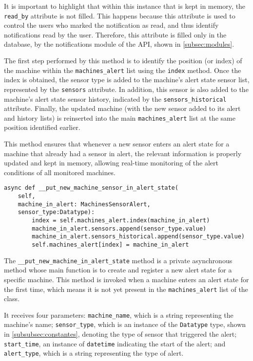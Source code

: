 It is important to highlight that within this instance that is kept in memory, the \texttt{read\_by} attribute is not filled. This happens because this attribute is used to control the users who marked the notification as read, and thus identify notifications read by the user. Therefore, this attribute is filled only in the database, by the notifications module of the \gls{API}, shown in \ref{subsec:modules}.

The first step performed by this method is to identify the position (or index) of the machine within the \texttt{machines\_alert} list using the \texttt{index} method. Once the index is obtained, the sensor type is added to the machine's alert state sensor list, represented by the \texttt{sensors} attribute. In addition, this sensor is also added to the machine's alert state sensor history, indicated by the \texttt{sensors\_historical} attribute. Finally, the updated machine (with the new sensor added to its alert and history lists) is reinserted into the main \texttt{machines\_alert} list at the same position identified earlier.

This method ensures that whenever a new sensor enters an alert state for a machine that already had a sensor in alert, the relevant information is properly updated and kept in memory, allowing real-time monitoring of the alert conditions of all monitored machines.

\begin{Verbatim}[fontsize=\small, baselinestretch=0.8]
async def __put_new_machine_sensor_in_alert_state(
    self,
    machine_in_alert: MachinesSensorAlert,
    sensor_type:Datatype):
        index = self.machines_alert.index(machine_in_alert)
        machine_in_alert.sensors.append(sensor_type.value)
        machine_in_alert.sensors_historical.append(sensor_type.value)
        self.machines_alert[index] = machine_in_alert
\end{Verbatim}

The \texttt{\_\_put\_new\_machine\_in\_alert\_state} method is a private asynchronous method whose main function is to create and register a new alert state for a specific machine. This method is invoked when a machine enters an alert state for the first time, which means it is not yet present in the \texttt{machines\_alert} list of the class.

It receives four parameters: \texttt{machine\_name}, which is a string representing the machine's name; \texttt{sensor\_type}, which is an instance of the \texttt{Datatype} type, shown in \ref{subsubsec:constantes}, denoting the type of sensor that triggered the alert; \texttt{start\_time}, an instance of \texttt{datetime} indicating the start of the alert; and \texttt{alert\_type}, which is a string representing the type of alert.

